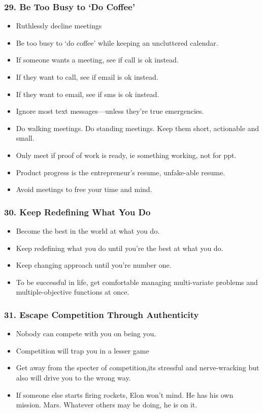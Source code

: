 \begin{frame}[fragile]
\frametitle{29. Be Too Busy to ‘Do Coffee'}
\begin{itemize}
\item Ruthlessly decline meetings
\item Be too busy to `do coffee' while keeping an uncluttered calendar.
\item If someone wants a meeting, see if call is ok instead. 
\item If they want to call, see if email is ok instead.
\item If they want to email, see if sms is ok instead.
\item  Ignore most text messages—unless they're true emergencies.
\item Do walking meetings. Do standing meetings. Keep them short, actionable and small. 
\item Only meet if proof of work is ready, ie something working, not for ppt.
\item  Product progress is the entrepreneur's resume, unfake-able resume.
\item Avoid meetings to free your time and mind.
\end{itemize}
\end{frame}

\begin{frame}[fragile]
\frametitle{30. Keep Redefining What You Do}
\begin{itemize}
\item Become the best in the world at what you do.
\item Keep redefining what you do until you're the best at what you do.
\item Keep changing approach until you're number one.
\item To be successful in life, get comfortable managing multi-variate problems
and multiple-objective functions at once. 
\end{itemize}
\end{frame}

\begin{frame}[fragile]
\frametitle{31. Escape Competition Through Authenticity}
\begin{itemize}
\item Nobody can compete with you on being you.
\item Competition will trap you in a lesser game
\item Get away from the specter of competition,its stressful and nerve-wracking but also will drive you to the wrong way.
\item If someone else starts firing rockets, Elon won't mind. He has his own mission. Mars. Whatever others may be doing, he is on it.
\end{itemize}
\end{frame}


